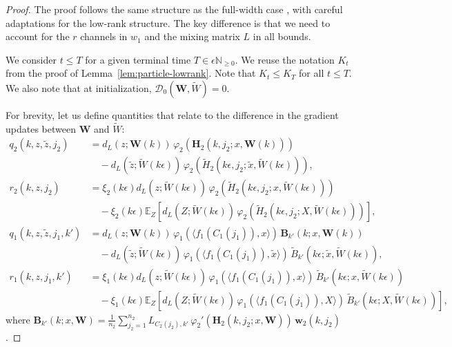 \begin{proof}
The proof follows the same structure as the full-width case \cite{nguyen2020global}, with careful adaptations for the low-rank structure. The key difference is that we need to account for the $r$ channels in $w_1$ and the mixing matrix $L$ in all bounds.

We consider $t \le T$ for a given terminal time $T \in \epsilon\mathbb{N}_{\ge 0}$. We reuse the notation $K_t$ from the proof of Lemma~\ref{lem:particle-lowrank}. Note that $K_t \le K_T$ for all $t \le T$. We also note that at initialization, $\mathscr{D}_0(\mathbf{W}, \tilde{W}) = 0$.

For brevity, let us define quantities that relate to the difference in the gradient updates between $\mathbf{W}$ and $\tilde{W}$:
\begin{align*}
q_2(k, z, \tilde{z}, j_2) &= d_L(z; \mathbf{W}(k))\,\varphi_2(\mathbf{H}_2(k, j_2; x, \mathbf{W}(k)))\\
&\quad - d_L(\tilde{z}; \tilde{W}(k\epsilon))\,\varphi_2(\tilde{H}_2(k\epsilon, j_2; \tilde{x}, \tilde{W}(k\epsilon))),\\
r_2(k, z, j_2) &= \xi_2(k\epsilon)d_L(z; \tilde{W}(k\epsilon))\,\varphi_2(\tilde{H}_2(k\epsilon, j_2; x, \tilde{W}(k\epsilon)))\\
&\quad - \xi_2(k\epsilon)\mathbb{E}_Z[d_L(Z; \tilde{W}(k\epsilon))\,\varphi_2(\tilde{H}_2(k\epsilon, j_2; X, \tilde{W}(k\epsilon)))],\\
q_1(k, z, \tilde{z}, j_1, k') &= d_L(z; \mathbf{W}(k))\,\varphi_1(\langle f_1(C_1(j_1)), x\rangle)\,\mathbf{B}_{k'}(k; x, \mathbf{W}(k))\\
&\quad - d_L(\tilde{z}; \tilde{W}(k\epsilon))\,\varphi_1(\langle f_1(C_1(j_1)), \tilde{x}\rangle)\,\tilde{B}_{k'}(k\epsilon; \tilde{x}, \tilde{W}(k\epsilon)),\\
r_1(k, z, j_1, k') &= \xi_1(k\epsilon)d_L(z; \tilde{W}(k\epsilon))\,\varphi_1(\langle f_1(C_1(j_1)), x\rangle)\,\tilde{B}_{k'}(k\epsilon; x, \tilde{W}(k\epsilon))\\
&\quad - \xi_1(k\epsilon)\mathbb{E}_Z[d_L(Z; \tilde{W}(k\epsilon))\,\varphi_1(\langle f_1(C_1(j_1)), X\rangle)\,\tilde{B}_{k'}(k\epsilon; X, \tilde{W}(k\epsilon))],
\end{align*}
where $\mathbf{B}_{k'}(k; x, \mathbf{W}) = \frac{1}{n_2}\sum_{j_2=1}^{n_2} L_{C_2(j_2),k'}\,\varphi_2'(\mathbf{H}_2(k, j_2; x, \mathbf{W}))\,\mathbf{w}_2(k, j_2)$.


\end{proof}
